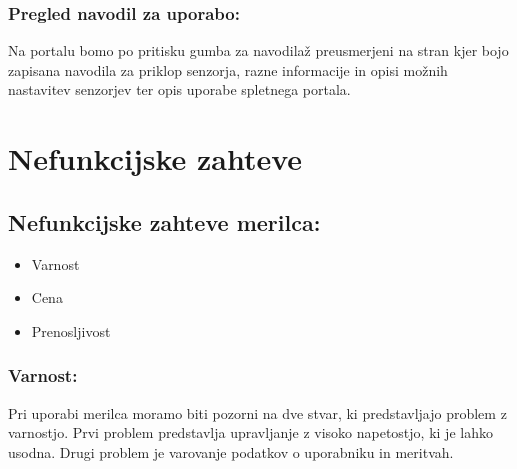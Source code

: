 \documentclass[12pt,a4paper,titlepage,openany]{report}
\begin{document}
\subsubsection{Pregled navodil za uporabo:}
Na portalu bomo po pritisku gumba za navodilaž preusmerjeni na stran kjer bojo zapisana navodila za priklop senzorja, razne informacije in opisi možnih nastavitev senzorjev ter opis uporabe spletnega portala.

\section{Nefunkcijske zahteve}
\thispagestyle{fancy}


\subsection{Nefunkcijske zahteve merilca:}

\begin{itemize}
\item Varnost
\item Cena
\item Prenosljivost
\end{itemize}

\subsubsection{Varnost:}

Pri uporabi merilca moramo biti pozorni na dve stvar, ki predstavljajo problem z varnostjo. Prvi problem predstavlja upravljanje z visoko napetostjo, ki je lahko usodna. Drugi problem je varovanje podatkov o uporabniku in meritvah.
\end{document}
